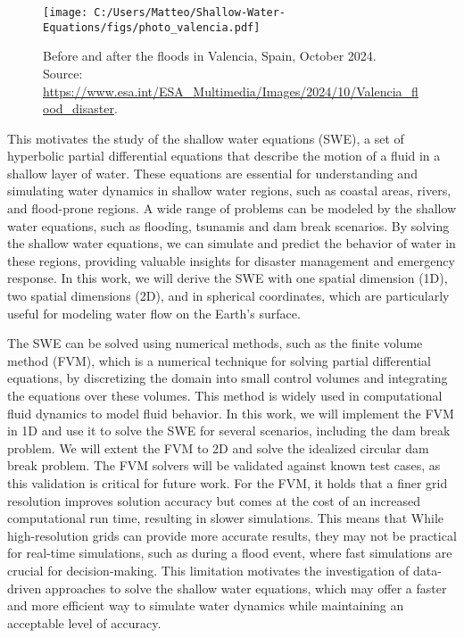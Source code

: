 \begin{figure}
    \centering
    \texttt{[image: C:/Users/Matteo/Shallow-Water-Equations/figs/photo\_valencia.pdf]}
    \caption{Before and after the floods in Valencia, Spain, October 2024.\\
            Source: \url{https://www.esa.int/ESA_Multimedia/Images/2024/10/Valencia_flood_disaster}.}\label{fig:valencia_flood}
\end{figure}

This motivates the study of the shallow water equations (SWE), a set of hyperbolic partial differential equations that describe the motion of a fluid in a shallow layer of water.
These equations are essential for understanding and simulating water dynamics in shallow water regions, such as coastal areas, rivers, and flood-prone regions.
A wide range of problems can be modeled by the shallow water equations, such as flooding, tsunamis and dam break scenarios.
By solving the shallow water equations, we can simulate and predict the behavior of water in these regions, providing valuable insights for disaster management and emergency response.
In this work, we will derive the SWE with one spatial dimension (1D), two spatial dimensions (2D), and in spherical coordinates, which are particularly useful for modeling water flow on the Earth's surface.

The SWE can be solved using numerical methods, such as the finite volume method (FVM), which is a numerical technique for solving partial differential equations, by discretizing the domain into small control volumes and integrating the equations over these volumes.
This method is widely used in computational fluid dynamics to model fluid behavior.
In this work, we will implement the FVM in 1D and use it to solve the SWE for several scenarios, including the dam break problem.
We will extent the FVM to 2D and solve the idealized circular dam break problem.
The FVM solvers will be validated against known test cases, as this validation is critical for future work.
For the FVM, it holds that a finer grid resolution improves solution accuracy but comes at the cost of an increased computational run time, resulting in slower simulations.
This means that While high-resolution grids can provide more accurate results, they may not be practical for real-time simulations, such as during a flood event, where fast simulations are crucial for decision-making.
This limitation motivates the investigation of data-driven approaches to solve the shallow water equations, which may offer a faster and more efficient way to simulate water dynamics while maintaining an acceptable level of accuracy.

